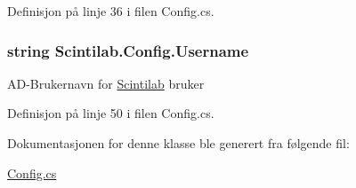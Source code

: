 Definisjon på linje 36 i filen Config.\+cs.

\hypertarget{class_scintilab_1_1_config_a46bec74f1139be16639b257d38580f22}{
\subsubsection[{Username}]{\setlength{\rightskip}{0pt plus 5cm}string Scintilab.\+Config.\+Username\hspace{0.3cm}{\ttfamily [static]}}}\label{class_scintilab_1_1_config_a46bec74f1139be16639b257d38580f22}
A\+D-\/\+Brukernavn for \hyperlink{namespace_scintilab}{Scintilab} bruker 

Definisjon på linje 50 i filen Config.\+cs.



Dokumentasjonen for denne klasse ble generert fra følgende fil\+:\begin{DoxyCompactItemize}
\item 
\hyperlink{_config_8cs}{Config.\+cs}\end{DoxyCompactItemize}
